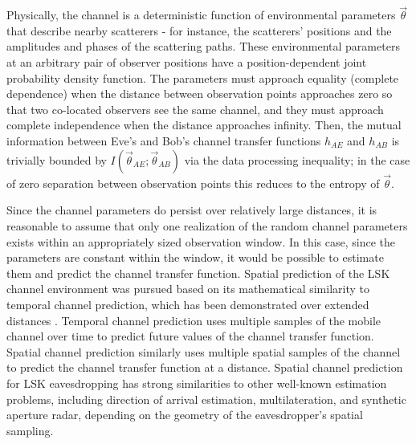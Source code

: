 \documentclass[12pt, titlepage]{article}
\begin{document}
Physically, the channel is a deterministic function of environmental parameters $\vec{\theta}$ that describe nearby scatterers - for instance, the scatterers' positions and the amplitudes and phases of the scattering paths.  These environmental parameters at an arbitrary pair of observer positions have a position-dependent joint probability density function.  The parameters must approach equality (complete dependence) when the distance between observation points approaches zero so that two co-located observers see the same channel, and they must approach complete independence when the distance approaches infinity.
Then, the mutual information between Eve's and Bob's channel transfer functions $h_{AE}$ and $h_{AB}$ is trivially bounded by $I(\vec{\theta}_{AE};\vec{\theta}_{AB})$ via the data processing inequality; in the case of zero separation between observation points this reduces to the entropy of $\vec{\theta}$.

Since the channel parameters do persist over relatively large distances, it is reasonable to assume that only one realization of the random channel parameters exists within an appropriately sized observation window.   In this case, since the parameters are constant within the window, it would be possible to estimate them and predict the channel transfer function.  Spatial prediction of the LSK channel environment was pursued based on its mathematical similarity to temporal channel prediction, which has been demonstrated over extended distances \cite{eyceoz1999, andersen1999, duel-hallen2000, isukapalli2006}.  Temporal channel prediction uses multiple samples of the mobile channel over time to predict future values of the channel transfer function.  Spatial channel prediction similarly uses multiple spatial samples of the channel to predict the channel transfer function at a distance.  Spatial channel prediction for LSK eavesdropping has strong similarities to other well-known estimation problems, including direction of arrival estimation, multilateration, and synthetic aperture radar, depending on the geometry of the eavesdropper's spatial sampling.
\end{document}
